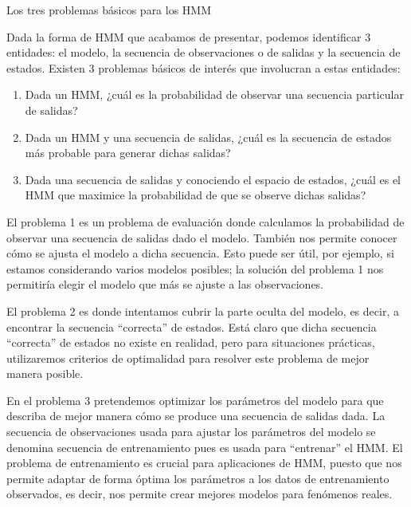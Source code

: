 \begin{section}{Los tres problemas básicos para los HMM}
    
Dada la forma de HMM que acabamos de presentar, podemos identificar 3 entidades: el modelo, la secuencia de observaciones o de salidas y la secuencia de estados. Existen 3 problemas básicos de interés que involucran a estas entidades:
\begin{enumerate}
    \item Dada un HMM, ¿cuál es la probabilidad de observar una secuencia particular de salidas?
    \item Dada un HMM y una secuencia de salidas, ¿cuál es la secuencia de estados más probable para generar dichas salidas?
    \item Dada una secuencia de salidas y conociendo el espacio de estados, ¿cuál es el HMM que maximice la probabilidad de que se observe dichas salidas?
\end{enumerate}

El problema 1 es un problema de evaluación donde calculamos la probabilidad de observar una secuencia de salidas dado el modelo. También nos permite conocer cómo se ajusta el modelo a dicha secuencia. Esto puede ser útil, por ejemplo, si estamos considerando varios modelos posibles; la solución del problema 1 nos permitiría elegir el modelo que más se ajuste a las observaciones.

El problema 2 es donde intentamos cubrir la parte oculta del modelo, es decir, a encontrar la secuencia \enquote{correcta} de estados. Está claro que dicha secuencia \enquote{correcta} de estados no existe en realidad, pero para situaciones prácticas, utilizaremos criterios de optimalidad para resolver este problema de mejor manera posible. 

En el problema 3 pretendemos optimizar los parámetros del modelo para que describa de mejor manera cómo se produce una secuencia de salidas dada. La secuencia de observaciones usada para ajustar los parámetros del modelo se denomina secuencia de entrenamiento pues es usada para \enquote{entrenar} el HMM. El problema de entrenamiento es crucial para aplicaciones de HMM, puesto que nos permite adaptar de forma óptima los parámetros a los datos de entrenamiento observados, es decir, nos permite crear mejores modelos para fenómenos reales.


\end{section}
